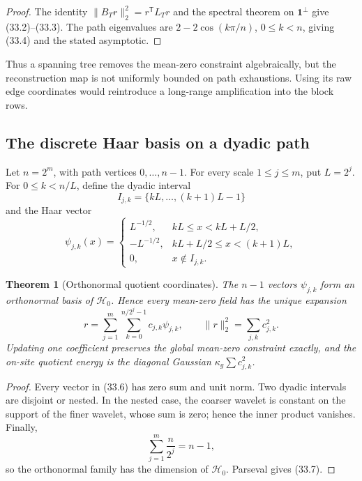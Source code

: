 \documentclass[11pt]{article}
\newtheorem{theorem}{Theorem}[section]
\theoremstyle{remark}
\begin{document}
\begin{proof}
The identity
\(\|B_Tr\|_2^2=r^{\mathsf T}L_Tr\) and the spectral theorem on
\(\mathbf1^\perp\) give (33.2)--(33.3).  The path eigenvalues are
\(2-2\cos(k\pi/n)\), \(0\leq k<n\), giving (33.4) and the stated
asymptotic.
\end{proof}

Thus a spanning tree removes the mean-zero constraint algebraically,
but the reconstruction map is not uniformly bounded on path
exhaustions.  Using its raw edge coordinates would reintroduce a
long-range amplification into the block rows.

\subsection{The discrete Haar basis on a dyadic path}

Let \(n=2^m\), with path vertices \(0,\ldots,n-1\).  For every scale
\(1\leq j\leq m\), put \(L=2^j\).  For
\(0\leq k<n/L\), define the dyadic interval
\[
 I_{j,k}=\{kL,\ldots,(k+1)L-1\}                    \tag{33.5}
\]
and the Haar vector
\[
 \psi_{j,k}(x)=
 \begin{cases}
 L^{-1/2},&kL\leq x<kL+L/2,\\
 -L^{-1/2},&kL+L/2\leq x<(k+1)L,\\
 0,&x\notin I_{j,k}.
 \end{cases}                                      \tag{33.6}
\]

\begin{theorem}[Orthonormal quotient coordinates]
\label{thm:v17v33-haar}
The \(n-1\) vectors \(\psi_{j,k}\) form an orthonormal basis of
\(\mathcal H_0\).  Hence every mean-zero field has the unique expansion
\[
 r=\sum_{j=1}^m\sum_{k=0}^{n/2^j-1}c_{j,k}\psi_{j,k},
 \qquad
 \|r\|_2^2=\sum_{j,k}c_{j,k}^2.                   \tag{33.7}
\]
Updating one coefficient preserves the global mean-zero constraint
exactly, and the on-site quotient energy is the diagonal Gaussian
\(\kappa_g\sum c_{j,k}^2\).
\end{theorem}

\begin{proof}
Every vector in (33.6) has zero sum and unit norm.  Two dyadic intervals
are disjoint or nested.  In the nested case, the coarser wavelet is
constant on the support of the finer wavelet, whose sum is zero; hence
the inner product vanishes.  Finally,
\[
 \sum_{j=1}^m\frac{n}{2^j}=n-1,                   \tag{33.8}
\]
so the orthonormal family has the dimension of \(\mathcal H_0\).
Parseval gives (33.7).
\end{proof}
\end{document}
